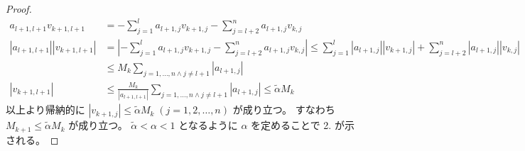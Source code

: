 \begin{proof}
\begin{align*}
                a_{l+1,l+1} v_{k+1, l+1} &= -\sum_{j=1}^l a_{l+1,j} v_{k+1, j} - \sum_{j=l+2}^n a_{l+1,j}v_{k,j} \\
                |a_{l+1,l+1}| |v_{k+1, l+1}| &= \left|-\sum_{j=1}^l a_{l+1,j} v_{k+1, j} - \sum_{j=l+2}^n a_{l+1,j}v_{k,j}\right| \leq \sum_{j=1}^l |a_{l+1,j}||v_{k+1, j}| + \sum_{j=l+2}^n |a_{l+1,j}||v_{k,j}| \\
                &\leq M_k \sum_{j=1,\dots,n \wedge j\neq l+1} |a_{l+1,j}| \\
                |v_{k+1, l+1}| &\leq \frac{M_k}{|a_{l+1,l+1}|} \sum_{j=1,\dots,n \wedge j\neq l+1} |a_{l+1,j}| \leq \tilde{\alpha} M_k
            \end{align*}
            以上より帰納的に $|v_{k+1,j}| \leq \tilde{\alpha} M_k\;(j=1,2,\dots,n)$ が成り立つ。
            すなわち $M_{k+1} \leq \tilde{\alpha} M_k$ が成り立つ。
            $\tilde{\alpha} < \alpha < 1$ となるように $\alpha $ を定めることで 2. が示される。
        \end{proof}
